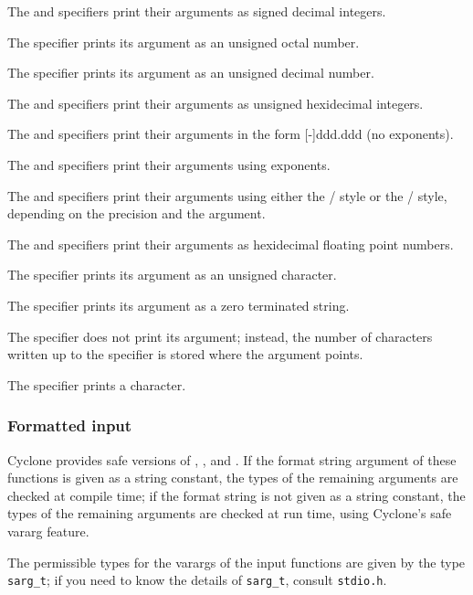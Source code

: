 The  and  specifiers print their arguments as signed
decimal integers.

The  specifier prints its argument as an unsigned octal number.

The  specifier prints its argument as an unsigned decimal number.

The  and  specifiers print their arguments as unsigned
hexidecimal integers.

The  and  specifiers print their arguments in the form
[-]ddd.ddd (no exponents).

The  and  specifiers print their arguments using exponents.

The  and  specifiers print their arguments using either
the /
style or the / style, depending on the precision and the
argument.

The  and  specifiers print their arguments as
hexidecimal floating point numbers.

The  specifier prints its argument as an unsigned character.

The  specifier prints its argument as a zero terminated string.

The  specifier does not print its argument; instead, the number
of characters written up to the  specifier is stored where the
argument points.

The \code{\%} specifier prints a \code{\%} character.


\subsubsection*{Formatted input}

Cyclone provides safe versions of , , and
.  If the format string argument of these functions is
given as a string constant, the types of the remaining arguments are
checked at compile time; if the format string is not given as a string
constant, the types of the remaining arguments are checked at run
time, using Cyclone's safe vararg feature.

The permissible types for the varargs of the input functions are given
by the type \texttt{sarg_t}; if you need to know the details of
\texttt{sarg_t}, consult \texttt{stdio.h}.

